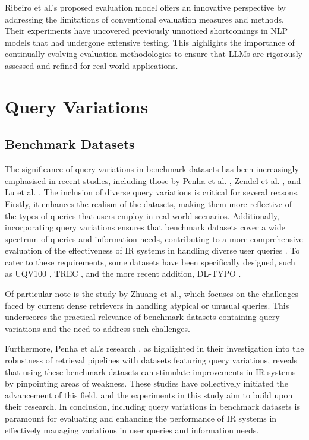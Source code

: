 Ribeiro et al.'s proposed evaluation model \cite{ribeiro} offers an innovative perspective by addressing the limitations of conventional evaluation measures and methods. Their experiments have uncovered previously unnoticed shortcomings in NLP models that had undergone extensive testing. This highlights the importance of continually evolving evaluation methodologies to ensure that LLMs are rigorously assessed and refined for real-world applications.

\section{Query Variations}
\subsection{Benchmark Datasets}
The significance of query variations in benchmark datasets has been increasingly emphasised in recent studies, including those by Penha et al. \cite{penha2022}, Zendel et al. \cite{zendel}, and Lu et al. \cite{lu}. The inclusion of diverse query variations is critical for several reasons. Firstly, it enhances the realism of the datasets, making them more reflective of the types of queries that users employ in real-world scenarios. Additionally, incorporating query variations ensures that benchmark datasets cover a wide spectrum of queries and information needs, contributing to a more comprehensive evaluation of the effectiveness of IR systems in handling diverse user queries \cite{penha2022, zendel, characterbert}. To cater to these requirements, some datasets have been specifically designed, such as UQV100 \cite{uqv}, TREC \cite{trec}, and the more recent addition, DL-TYPO \cite{characterbert}.

Of particular note is the study by Zhuang et al., which focuses on the challenges faced by current dense retrievers in handling atypical or unusual queries. This underscores the practical relevance of benchmark datasets containing query variations and the need to address such challenges.

Furthermore, Penha et al.'s research \cite{penha2022}, as highlighted in their investigation into the robustness of retrieval pipelines with datasets featuring query variations, reveals that using these benchmark datasets can stimulate improvements in IR systems by pinpointing areas of weakness. These studies have collectively initiated the advancement of this field, and the experiments in this study aim to build upon their research. In conclusion, including query variations in benchmark datasets is paramount for evaluating and enhancing the performance of IR systems in effectively managing variations in user queries and information needs.

